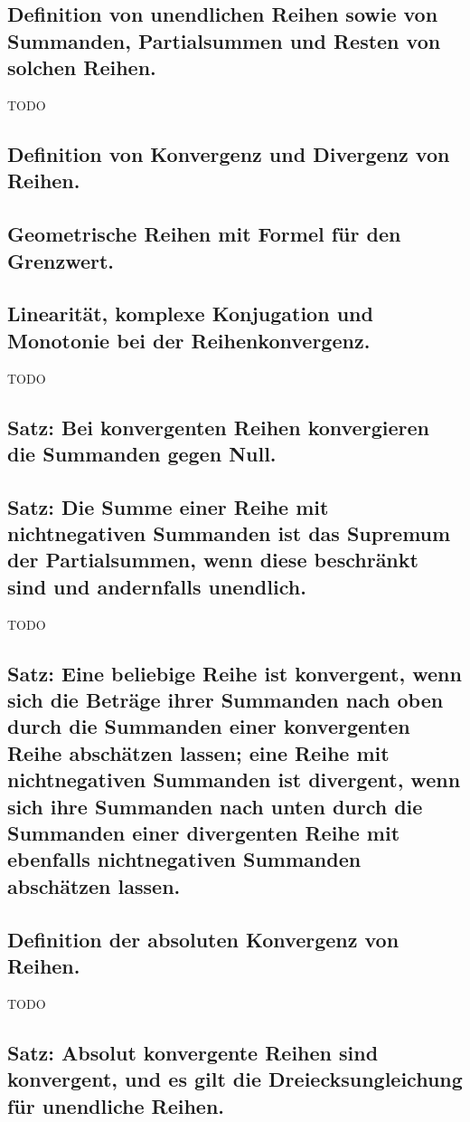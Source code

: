 \subsection{Definition von unendlichen Reihen sowie von Summanden, Partialsummen und Resten von solchen Reihen.}
TODO
\subsection{Definition von Konvergenz und Divergenz von Reihen.}

\subsection{Geometrische Reihen mit Formel für den Grenzwert.}

\subsection{Linearität, komplexe Konjugation und Monotonie bei der Reihenkonvergenz.}
TODO
\subsection{Satz: Bei konvergenten Reihen konvergieren die Summanden gegen Null.}

\subsection{Satz: Die Summe einer Reihe mit nichtnegativen Summanden ist das Supremum der Partialsummen, wenn diese beschränkt sind und andernfalls unendlich.}
TODO
\subsection{Satz: Eine beliebige Reihe ist konvergent, wenn sich die Beträge ihrer Summanden nach oben durch die Summanden einer konvergenten Reihe abschätzen lassen; eine Reihe mit nichtnegativen Summanden ist divergent, wenn sich ihre Summanden nach unten durch die Summanden einer divergenten Reihe mit ebenfalls nichtnegativen Summanden abschätzen lassen.}

\subsection{Definition der absoluten Konvergenz von Reihen.}

TODO
\subsection{Satz: Absolut konvergente Reihen sind konvergent, und es gilt die Dreiecksungleichung für unendliche Reihen.}


